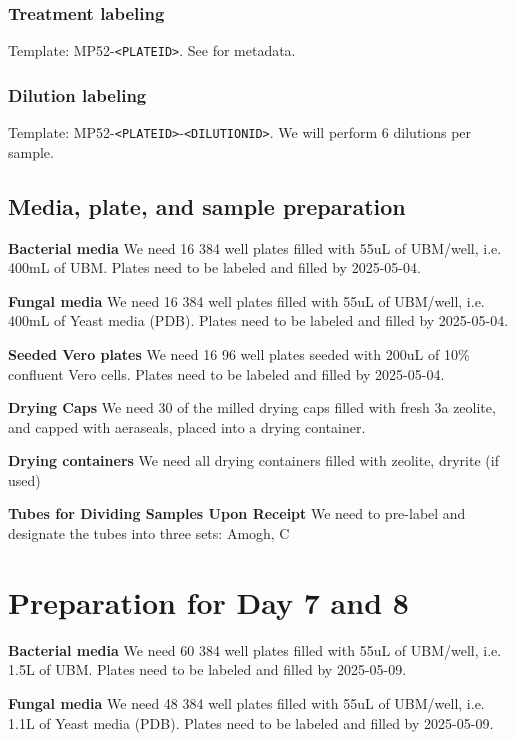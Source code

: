 \documentclass{article}
\begin{document}
\subsubsection{Treatment labeling}
Template: \textsc{MP52}-\texttt{<PLATEID>}. See  for metadata.

\subsubsection{Dilution labeling}

Template: \textsc{MP52}-\texttt{<PLATEID>}-\texttt{<DILUTIONID>}. 
We will perform 6 dilutions per sample.

\subsection{Media, plate, and sample preparation}
\textbf{Bacterial media} We need 16 384 well plates filled with 55uL of UBM/well, i.e. 400mL of UBM. Plates need to be labeled and filled by 2025-05-04. 

\textbf{Fungal media} We need 16 384 well plates filled with 55uL of UBM/well, i.e. 400mL of Yeast media (PDB). Plates need to be labeled and filled by 2025-05-04.

\textbf{Seeded Vero plates} We need 16 96 well plates seeded with 200uL of 10\% confluent Vero cells. Plates need to be labeled and filled by 2025-05-04.

\textbf{Drying Caps} We need 30 of the milled drying caps filled with fresh 3a zeolite, and capped with aeraseals, placed into a drying container. 

\textbf{Drying containers} We need all drying containers filled with zeolite, dryrite (if used) 

\textbf{Tubes for Dividing Samples Upon Receipt} We need to pre-label and designate the tubes into three sets: Amogh, C

\section{Preparation for Day 7 and 8}\label{sec:day7-prep}
\textbf{Bacterial media} We need 60 384 well plates filled with 55uL of UBM/well, i.e. 1.5L of UBM. Plates need to be labeled and filled by 2025-05-09.

\textbf{Fungal media} We need 48 384 well plates filled with 55uL of UBM/well, i.e. 1.1L of Yeast media (PDB). Plates need to be labeled and filled by 2025-05-09.
\end{document}
